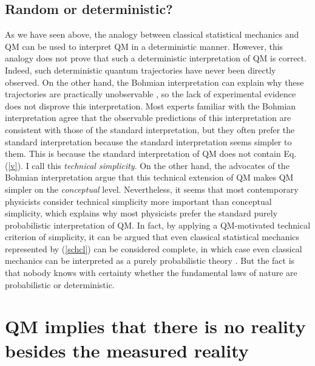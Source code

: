 \documentclass[12pt]{article}
\begin{document}

\subsection{Random or deterministic?}

As we have seen above,
the analogy between classical statistical mechanics and 
QM can be used to interpret
QM in a deterministic manner. However, this analogy does not prove 
that such a deterministic interpretation of QM is correct.
Indeed, such deterministic quantum trajectories have never been 
directly observed. On the other hand, the Bohmian interpretation 
can explain why these trajectories are practically unobservable
\cite{duerr}, so the lack of experimental evidence does not 
disprove this interpretation. Most experts familiar with 
the Bohmian interpretation agree that the 
observable predictions of this 
interpretation are consistent with those of the standard 
interpretation, but they often prefer the standard interpretation 
because the standard interpretation seems simpler to them. 
This is because the standard interpretation of QM does not contain 
Eq. (\ref{v}). I call this {\em technical simplicity}. 
On the other hand, the advocates of the Bohmian interpretation 
argue that this technical extension 
of QM makes QM simpler on the {\em conceptual} level.  
Nevertheless, it seems that most contemporary physicists consider 
technical simplicity more important than conceptual simplicity, 
which explains why most physicists prefer the standard 
purely probabilistic interpretation of QM. In fact, 
by applying a QM-motivated technical criterion of simplicity, 
it can be argued 
that even classical statistical mechanics represented by (\ref{schcl})
can be considered complete, in which case even classical mechanics 
can be interpreted as a purely probabilistic theory \cite{nikolcl}.   
But the fact is that nobody knows with certainty whether the fundamental 
laws of nature are probabilistic or deterministic.

\section{QM implies that there is no reality besides the measured 
reality}
\label{NOREAL}
\end{document}
